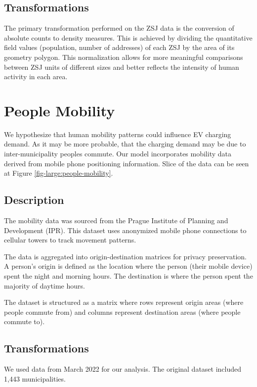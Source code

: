 \subsection{Transformations}

The primary transformation performed on the ZSJ data is the conversion of absolute counts to density measures. This is achieved by dividing the quantitative field values (population, number of addresses) of each ZSJ by the area of its geometry polygon. This normalization allows for more meaningful comparisons between ZSJ units of different sizes and better reflects the intensity of human activity in each area.

\section{People Mobility}

We hypothesize that human mobility patterns could influence EV charging demand. As it may be more probable, that the charging demand may be due to inter-municipality peoples commute. Our model incorporates mobility data derived from mobile phone positioning information. Slice of the data can be seen at Figure \ref{fig-large:people-mobility}.

\subsection{Description}

The mobility data was sourced from the Prague Institute of Planning and Development (IPR). This dataset uses anonymized mobile phone connections to cellular towers to track movement patterns.

The data is aggregated into origin-destination matrices for privacy preservation. A person's origin is defined as the location where the person (their mobile device) spent the night and morning hours. The destination is where the person spent the majority of daytime hours.

The dataset is structured as a matrix where rows represent origin areas (where people commute from) and columns represent destination areas (where people commute to).

\subsection{Transformations}

We used data from March 2022 for our analysis. The original dataset included 1,443 municipalities.

